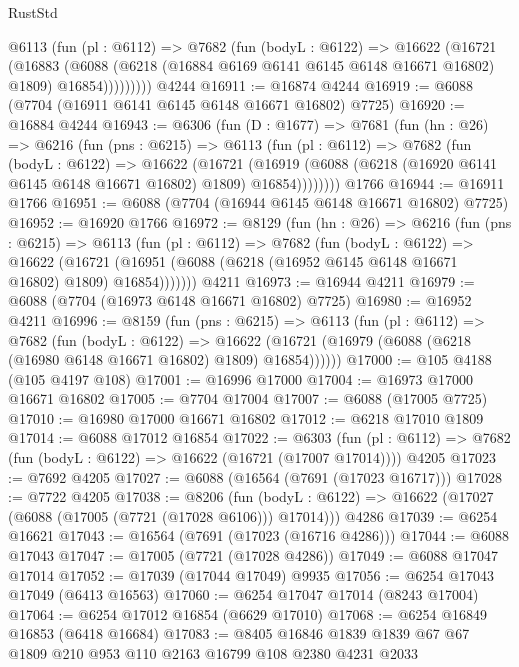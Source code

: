 \begin{lexlean}{RustStd}
\begin{coremodule}
          @6113
            (fun (pl : @6112) =>
            @7682
              (fun (bodyL : @6122) =>
              @16622
                (@16721
                  (@16883
                    (@6088
                      (@6218 (@16884 @6169 @6141 @6145 @6148 @16671 @16802) @1809)
                      @16854)))))))))
    @4244
@16911 := @16874 @4244
@16919 := @6088 (@7704 (@16911 @6141 @6145 @6148 @16671 @16802) @7725)
@16920 := @16884 @4244
@16943 := @6306
    (fun (D : @1677) =>
    @7681
      (fun (hn : @26) =>
      @6216
        (fun (pns : @6215) =>
        @6113
          (fun (pl : @6112) =>
          @7682
            (fun (bodyL : @6122) =>
            @16622
              (@16721
                (@16919 (@6088 (@6218 (@16920 @6141 @6145 @6148 @16671 @16802) @1809) @16854))))))))
    @1766
@16944 := @16911 @1766
@16951 := @6088 (@7704 (@16944 @6145 @6148 @16671 @16802) @7725)
@16952 := @16920 @1766
@16972 := @8129
    (fun (hn : @26) =>
    @6216
      (fun (pns : @6215) =>
      @6113
        (fun (pl : @6112) =>
        @7682
          (fun (bodyL : @6122) =>
          @16622
            (@16721 (@16951 (@6088 (@6218 (@16952 @6145 @6148 @16671 @16802) @1809) @16854)))))))
    @4211
@16973 := @16944 @4211
@16979 := @6088 (@7704 (@16973 @6148 @16671 @16802) @7725)
@16980 := @16952 @4211
@16996 := @8159
    (fun (pns : @6215) =>
    @6113
      (fun (pl : @6112) =>
      @7682
        (fun (bodyL : @6122) =>
        @16622 (@16721 (@16979 (@6088 (@6218 (@16980 @6148 @16671 @16802) @1809) @16854))))))
@17000 := @105 @4188 (@105 @4197 @108)
@17001 := @16996 @17000
@17004 := @16973 @17000 @16671 @16802
@17005 := @7704 @17004
@17007 := @6088 (@17005 @7725)
@17010 := @16980 @17000 @16671 @16802
@17012 := @6218 @17010 @1809
@17014 := @6088 @17012 @16854
@17022 := @6303
    (fun (pl : @6112) => @7682 (fun (bodyL : @6122) => @16622 (@16721 (@17007 @17014))))
    @4205
@17023 := @7692 @4205
@17027 := @6088 (@16564 (@7691 (@17023 @16717)))
@17028 := @7722 @4205
@17038 := @8206
    (fun (bodyL : @6122) => @16622 (@17027 (@6088 (@17005 (@7721 (@17028 @6106))) @17014)))
    @4286
@17039 := @6254 @16621
@17043 := @16564 (@7691 (@17023 (@16716 @4286)))
@17044 := @6088 @17043
@17047 := @17005 (@7721 (@17028 @4286))
@17049 := @6088 @17047 @17014
@17052 := @17039 (@17044 @17049) @9935
@17056 := @6254 @17043 @17049 (@6413 @16563)
@17060 := @6254 @17047 @17014 (@8243 @17004)
@17064 := @6254 @17012 @16854 (@6629 @17010)
@17068 := @6254 @16849 @16853 (@6418 @16684)
@17083 := @8405 @16846 @1839 @1839 @67 @67 @1809 @210 @953 @110 @2163 @16799 @108 @2380 @4231 @2033

\end{coremodule}
\end{lexlean}
